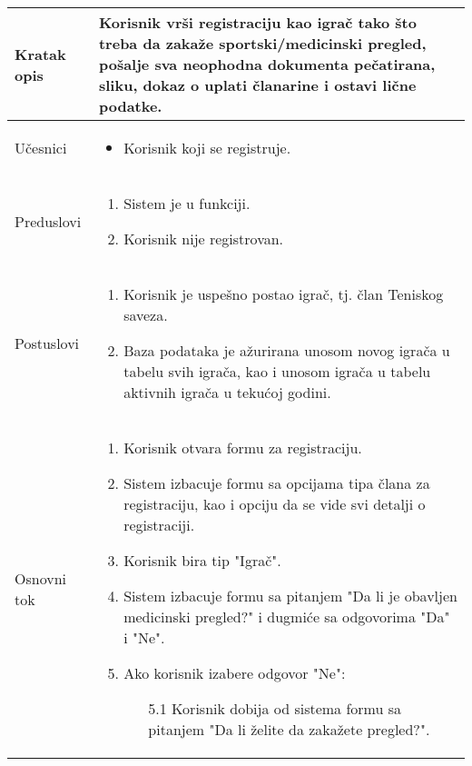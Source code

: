 \documentclass{article}
\begin{document}
        \begin{longtable}{| p{} | p{} |} 
            \hline
                Kratak opis & Korisnik vrši registraciju kao igrač tako što treba da zakaže sportski/medicinski pregled, pošalje sva neophodna dokumenta pečatirana, sliku, dokaz o uplati članarine i ostavi lične podatke.\\ 
            \hline    
                Učesnici & \begin{itemize}
                    \item Korisnik koji se registruje.
                \end{itemize} \\
            \hline
               Preduslovi & \begin{enumerate}
                   \item Sistem je u funkciji.
                   \item Korisnik nije registrovan.
               \end{enumerate}\\
            \hline  
                Postuslovi & \begin{enumerate}
                    \item Korisnik je uspešno postao igrač, tj. član Teniskog saveza.
                    \item Baza podataka je ažurirana unosom novog igrača u tabelu svih igrača, kao i unosom igrača u tabelu aktivnih igrača u tekućoj godini.
                \end{enumerate}\\
            \hline
                Osnovni tok & \begin{enumerate}
                    \item Korisnik otvara formu za registraciju.
                    \item Sistem izbacuje formu sa opcijama tipa člana za registraciju, kao i opciju da se vide svi detalji o registraciji.
                    \item Korisnik bira tip "Igrač".
                    \item Sistem izbacuje formu sa pitanjem "Da li je obavljen medicinski pregled?" i dugmiće sa odgovorima "Da" i "Ne".
                    \item Ako korisnik izabere odgovor "Ne":
                    \begin{enumerate}
                        \item[5.1] Korisnik dobija od sistema formu sa pitanjem "Da li želite da zakažete pregled?".

\end{enumerate}
\end{enumerate}
\end{longtable}
\end{document}
